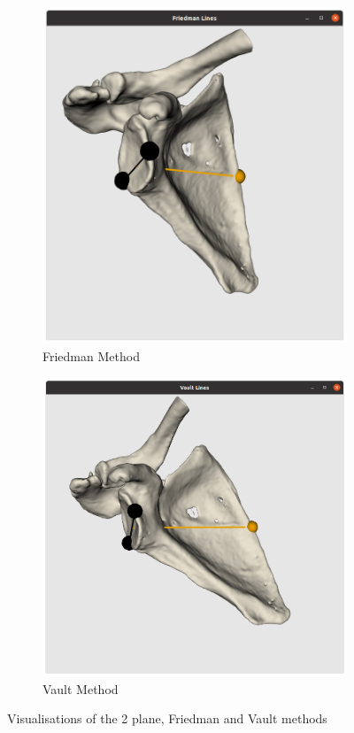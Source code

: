 \begin{figure}
\begin{center}
\begin{subfigure}[b]{0.26\linewidth}
			\includegraphics[width=\linewidth]{figures/friedman_vis.png}
			\caption{\label{fig:visfried}Friedman Method}
		\end{subfigure}	
                \begin{subfigure}[b]{0.32\linewidth}
			\includegraphics[width=\linewidth]{figures/vault_vis.png}
			\caption{\label{fig:visvault}Vault Method}
		\end{subfigure}	
	\end{center}
	\caption{\label{fig:visualisations}Visualisations of the 2 plane, Friedman and Vault methods}
\end{figure}


